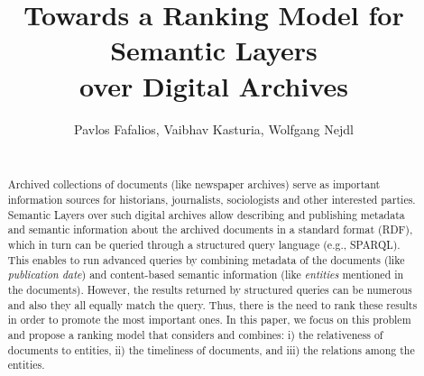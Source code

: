\documentclass{libtex/sig-alternate-05-2015}
\begin{document}



\title{
    Towards a Ranking Model for Semantic Layers\\over Digital Archives
}

\author{
Pavlos Fafalios, Vaibhav Kasturia, Wolfgang Nejdl\\
\\
}

\maketitle


\begin{abstract}
Archived collections of documents (like newspaper archives)
serve as important information sources for historians, journalists, sociologists
and other interested parties.
Semantic Layers over such digital archives allow describing and publishing metadata and semantic
information about the archived documents in a standard format (RDF),
which in turn can be queried through a structured query language (e.g., SPARQL).
This enables to run advanced queries by combining
metadata of the documents (like {\em publication date}) and content-based semantic information
(like {\em entities} mentioned in the documents).
However, the results returned by structured queries
can be numerous and also they all equally match the query.
Thus, there is the need to rank these results in order to promote
the most important ones.
In this paper, we focus on this problem
and propose a ranking model that considers and combines:
i) the relativeness of documents to entities,
ii) the timeliness of documents, and
iii) the relations among the entities.
\end{abstract}
\end{document}
